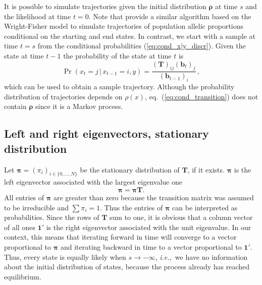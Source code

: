 \documentclass[preprint]{elsarticle}
\newcommand{\bs}[1]{\ensuremath{\boldsymbol{#1}}}
\newcommand\given{{\,|\,}}
\newcommand\ie{{\it i.e.,}}
\newcommand\x[1]{\ensuremath{x_{#1}}}
\newcommand\y{\ensuremath{y}}
\newcommand\s{\ensuremath{s}}
\newcommand\oneC{\ensuremath{\mathbf{1}'}}
\begin{document}
It is possible to simulate trajectories given the initial distribution $\bs{\rho}$ at time $\s$ and the likelihood at time $t=0$. Note that \citet{Zhao14} provide a similar algorithm based on the Wright-Fisher model to simulate trajectories of population allelic proportions conditional on the starting and end states. In contrast, we start with a sample at time $t=\s$ from the conditional probabilities (\ref{eq:cond_x|y_discr}). Given the state at time $t-1$ the probability of the state at time $t$ is
\begin{equation}\label{eq:cond_transition}
    \Pr(\x{t}=j\given \x{t-1}=i,\y)=\frac{(\mathbf{T})_{ij}(\mathbf{b}_{t})_j}{(\mathbf{b}_{t-1})_i}\,,
\end{equation}
which can be used to obtain a sample trajectory. Although the probability distribution of trajectories depends on $\rho(x)$, eq.~(\ref{eq:cond_transition}) does not contain $\bs{\rho}$ since it is a Markov process.

\subsection{Left and right eigenvectors, stationary distribution}

Let $\bs{\pi} = (\pi_i)_{i \in \{0,\ldots,N\}}$ be the stationary distribution of $\mathbf{T}$, if it exists.%
$\bs{\pi}$ is the left eigenvector associated with the largest eigenvalue one~\citep[][p. 87]{Ewen04}
\begin{equation}\label{eq:stationary}
\bs{\pi}=\bs{\pi}\mathbf{T}.
\end{equation}
All entries of $\bs{\pi}$ are greater than zero because the transition matrix was assumed to be irreducible and $\sum \pi_i = 1$. Thus the entries of $\bs{\pi}$ can be interpreted as probabilities. Since the rows of $\mathbf{T}$ sum to one, it is obvious that a column vector of all ones $\oneC$ is the right eigenvector associated with the unit eigenvalue. In our context, this means that iterating forward in time will converge to a vector proportional to $\bs{\pi}$ and iterating backward in time to a vector proportional to $\oneC$. Thus, every state is equally likely when  $s\to-\infty$, \ie\ we have no information about the initial distribution of states, because the process already has reached equilibrium. %
\end{document}
